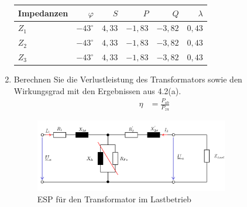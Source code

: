 \begin{enumerate}[label=\alph*)]
\begin{table}[h!]
		      \centering
		      \begin{tabular}{lrrrrr}
			      \hline
			      Impedanzen & $\varphi$     & $S$    & $P$      & $Q$     & $\lambda$ \\ \hline
			      $Z_1$      & $-43^\circ$   & $4,33$ & $-1,83$  & $-3,82$ & $0,43$    \\
			      $Z_2$      & $-43^\circ$   & $4,33$ & $-1,83 $ & $-3,82$ & $0,43$    \\
			      $Z_3$      & $-43^\circ  $ & $4,33$ & $-1,83$  & $-3,82$ & $0,43$    \\ \hline
		      \end{tabular}
	      \end{table}

	\item Berechnen Sie die Verlustleistung des Transformators sowie den Wirkungsgrad mit
	      den Ergebnissen aus 4.2(a).
	      \begin{align*}
		      \eta & = \frac{P_{ab}}{P_{zu}}
	      \end{align*}

	      \begin{figure}[h!]
		      \begin{center}
			      \includegraphics[width=0.8\textwidth]{img/4.2.2.1}
		      \end{center}
		      \caption{ESP für den Transformator im Lastbetrieb}\label{img:4.2.2.1}
	      \end{figure}


\end{enumerate}
